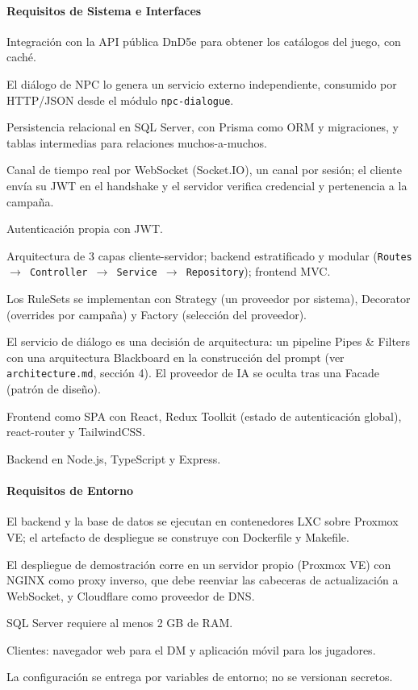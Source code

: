 \paragraph{Requisitos de Sistema e Interfaces}
\begin{description}[leftmargin=2.2cm,labelwidth=2cm,itemsep=2pt]
\item[RS-001] Integración con la API pública DnD5e para obtener los catálogos del juego, con caché.
\item[RS-002] El diálogo de NPC lo genera un servicio externo independiente, consumido por HTTP/JSON desde el módulo \texttt{npc-dialogue}.
\item[RS-003] Persistencia relacional en SQL Server, con Prisma como ORM y migraciones, y tablas intermedias para relaciones muchos-a-muchos.
\item[RS-004] Canal de tiempo real por WebSocket (Socket.IO), un canal por sesión; el cliente envía su JWT en el handshake y el servidor verifica credencial y pertenencia a la campaña.
\item[RS-005] Autenticación propia con JWT.
\item[RS-006] Arquitectura de 3 capas cliente-servidor; backend estratificado y modular (\texttt{Routes $\rightarrow$ Controller $\rightarrow$ Service $\rightarrow$ Repository}); frontend MVC.
\item[RS-007] Los RuleSets se implementan con Strategy (un proveedor por sistema), Decorator (overrides por campaña) y Factory (selección del proveedor).
\item[RS-008] El servicio de diálogo es una decisión de arquitectura: un pipeline Pipes \& Filters con una arquitectura Blackboard en la construcción del prompt (ver \texttt{architecture.\allowbreak{}md}, sección 4). El proveedor de IA se oculta tras una Facade (patrón de diseño).
\item[RS-009] Frontend como SPA con React, Redux Toolkit (estado de autenticación global), react-router y TailwindCSS.
\item[RS-010] Backend en Node.js, TypeScript y Express.
\end{description}
\paragraph{Requisitos de Entorno}
\begin{description}[leftmargin=2.2cm,labelwidth=2cm,itemsep=2pt]
\item[RE-001] El backend y la base de datos se ejecutan en contenedores LXC sobre Proxmox VE; el artefacto de despliegue se construye con Dockerfile y Makefile.
\item[RE-002] El despliegue de demostración corre en un servidor propio (Proxmox VE) con NGINX como proxy inverso, que debe reenviar las cabeceras de actualización a WebSocket, y Cloudflare como proveedor de DNS.
\item[RE-003] SQL Server requiere al menos 2 GB de RAM.
\item[RE-004] Clientes: navegador web para el DM y aplicación móvil para los jugadores.
\item[RE-005] La configuración se entrega por variables de entorno; no se versionan secretos.
\end{description}
